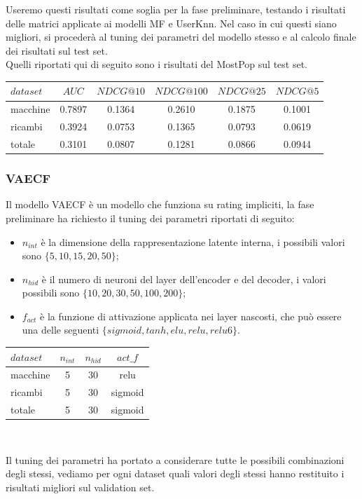 Useremo questi risultati come soglia per la fase preliminare, testando i risultati delle matrici applicate ai modelli MF e UserKnn. Nel caso in cui questi siano migliori, si procederà al tuning dei parametri del modello stesso e al calcolo finale dei risultati sul test set.\\
Quelli riportati qui di seguito sono i risultati del MostPop sul test set.\\

\begin{tabular}{|l|c|cccc|}
    \toprule
    $dataset$ &    $AUC$ &  $NDCG@10$ & $NDCG@100$  & $NDCG@25$ & $NDCG@5$  \\
    \midrule
    macchine & 0.7897 &  0.1364 &   0.2610 &  0.1875 & 0.1001 \\
    ricambi  & 0.3924 &  0.0753 &   0.1365 &  0.0793 & 0.0619 \\
    totale  & 0.3101 &  0.0807 &   0.1281 &  0.0866 & 0.0944 \\

\bottomrule
\end{tabular}

\subsubsection{VAECF}
Il modello VAECF è un modello che funziona su rating impliciti, la fase preliminare ha richiesto il tuning dei parametri riportati di seguito:
\begin{itemize}
    \item $n_{int}$ è la dimensione della rappresentazione latente interna, i possibili valori sono $\{5,10,15,20,50\}$;
    \item $n_{hid}$ è il numero di neuroni del layer dell'encoder e del decoder, i valori possibili sono $\{10,20,30,50,100,200\}$;
    \item $f_{act}$ è la funzione di attivazione applicata nei layer nascosti, che può essere una delle seguenti $\{sigmoid, tanh, elu, relu, relu6\}$.
\end{itemize}
\begin{minipage}[H]{0.45\textwidth}
    \begin{tabular}{|l|ccc|}
        \toprule
        $dataset$ &    $n_{int}$ &  $n_{hid}$ & $act\_f$ \\
        \midrule
        macchine & 5 & 30 & relu \\
        ricambi  &	5 & 30 & sigmoid\\
        totale  & 5 & 30 & sigmoid\\
    \bottomrule
    \end{tabular}\\
\end{minipage}
\begin{minipage}[H]{0.55\textwidth}
    Il tuning dei parametri ha portato a considerare tutte le possibili combinazioni degli stessi, vediamo per ogni dataset quali valori degli stessi hanno restituito i risultati migliori sul validation set.
\end{minipage}\\

